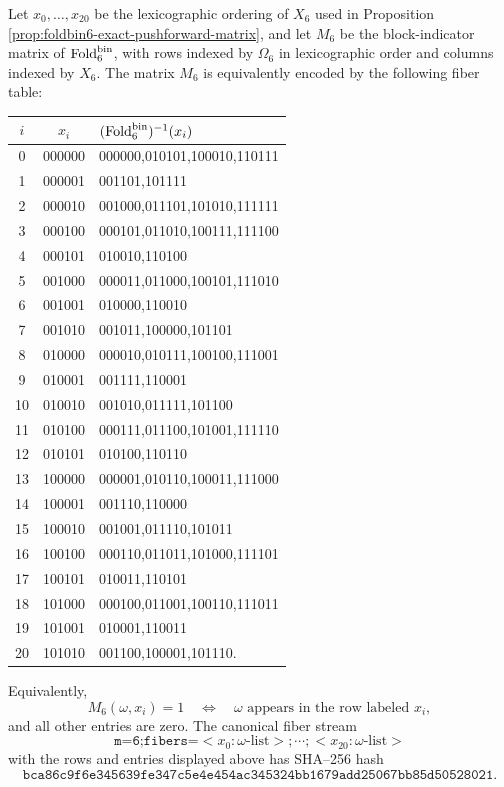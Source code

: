 \begin{proposition}\label{prop:foldbin6-canonical-fiber-table}
Let \(x_0,
\ldots,x_{20}\) be the lexicographic ordering of \(X_6\) used in Proposition \ref{prop:foldbin6-exact-pushforward-matrix}, and let \(M_6\) be the block-indicator matrix of \(\operatorname{Fold}_6^{\mathrm{bin}}\), with rows indexed by \(\Omega_6\) in lexicographic order and columns indexed by \(X_6\).  The matrix \(M_6\) is equivalently encoded by the following fiber table:
\begin{center}
\scriptsize
\begin{tabular}{c|c|l}
\(i\)&\(x_i\)&\((\operatorname{Fold}_6^{\mathrm{bin}})^{-1}(x_i)\)\\ \hline
0&000000&000000,010101,100010,110111\\
1&000001&001101,101111\\
2&000010&001000,011101,101010,111111\\
3&000100&000101,011010,100111,111100\\
4&000101&010010,110100\\
5&001000&000011,011000,100101,111010\\
6&001001&010000,110010\\
7&001010&001011,100000,101101\\
8&010000&000010,010111,100100,111001\\
9&010001&001111,110001\\
10&010010&001010,011111,101100\\
11&010100&000111,011100,101001,111110\\
12&010101&010100,110110\\
13&100000&000001,010110,100011,111000\\
14&100001&001110,110000\\
15&100010&001001,011110,101011\\
16&100100&000110,011011,101000,111101\\
17&100101&010011,110101\\
18&101000&000100,011001,100110,111011\\
19&101001&010001,110011\\
20&101010&001100,100001,101110.
\end{tabular}
\end{center}
Equivalently,
\[
M_6(\omega,x_i)=1
\quad\Longleftrightarrow\quad
\omega\text{ appears in the row labeled }x_i,
\]
and all other entries are zero.  The canonical fiber stream
\[
\texttt{m=6;fibers=}<x_0:\omega\text{-list}>;\cdots;<x_{20}:\omega\text{-list}>
\]
with the rows and entries displayed above has SHA--256 hash
\[
\texttt{bca86c9f6e345639fe347c5e4e454ac345324bb1679add25067bb85d50528021}.
\]
\end{proposition}

